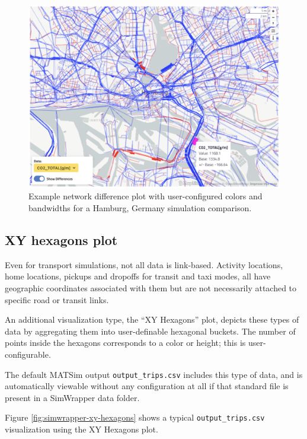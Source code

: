 \begin{figure}[ht]
  \centering
  \includegraphics[width=0.7\linewidth]{chapters/31-simwrapper/images/network-links.png}
  \caption{Example network difference plot with user-configured colors and bandwidths for a Hamburg, Germany simulation comparison. }
  \label{fig:simwrapper-network-links}
\end{figure}


\hypertarget{simwrapper-xy-hexagon-plots}{%
\subsection{XY hexagons plot}\label{simwrapper-xy-hexagon-plots}}

Even for transport simulations, not all data is link-based. Activity locations, home locations, pickups and dropoffs for transit and taxi modes, all have geographic coordinates associated with them but are not necessarily attached to specific road or transit links.

An additional visualization type, the ``XY Hexagons'' plot, depicts these types of data by aggregating them into user-definable hexagonal buckets. The number of points inside the hexagons corresponds to a color or height; this is user-configurable.

The default MATSim output \texttt{output\_trips.csv} includes this type of data, and is automatically viewable without any configuration at all if that standard file is present in a SimWrapper data folder.

Figure \ref{fig:simwrapper-xy-hexagons} shows a typical \texttt{output\_trips.csv} visualization using the XY Hexagons plot.

